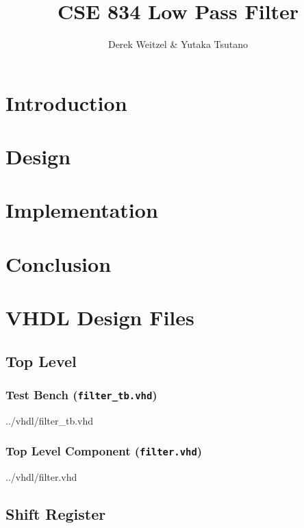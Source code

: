 \documentclass[12pt]{article}
\title{CSE 834 Low Pass Filter}
\author{Derek Weitzel \& Yutaka Tsutano}
\newcommand{\VhdlListing}{}
\begin{document}
\maketitle

\section{Introduction} \label{sec:introduction}


\section{Design}
\label{sec:design}




\section{Implementation} \label{sec:implementation}


\section{Conclusion} \label{sec:conclusion}


\newpage
\appendix

\section{VHDL Design Files}

\subsection{Top Level}

\subsubsection{Test Bench (\texttt{filter\_tb.vhd})}
\label{lst:filter_tb.vhd}
\VhdlListing{../vhdl/filter_tb.vhd}

\subsubsection{Top Level Component (\texttt{filter.vhd})}
\label{lst:filter.vhd}
\VhdlListing{../vhdl/filter.vhd}

\subsection{Shift Register}
\end{document}
